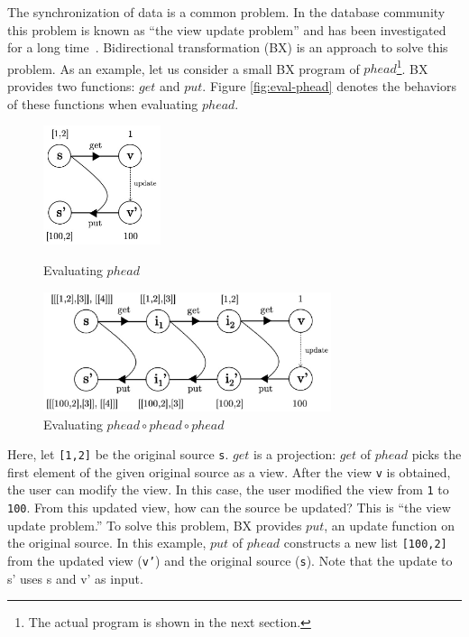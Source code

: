 The synchronization of data is a common problem. In the database community this problem is known as “the view update problem” and has been investigated for a long time~\cite{viewupdate}. Bidirectional transformation (BX) is an approach to solve this problem.
As an example, let us consider a small BX program of $phead$\footnote{The actual program is shown in the next section.}. BX provides two functions: $get$ and $put$. Figure \ref{fig:eval-phead} denotes the behaviors of these functions when evaluating $phead$.

\begin{figure}[!t]
  \begin{minipage}{0.3\textwidth}
    \centering
    \includegraphics[height=3.5cm]{./fig/fig1.eps}
    \caption{Evaluating $phead$}
    \label{fig:eval-phead}
  \end{minipage}\hfill
  \begin{minipage}{0.7\textwidth}
    \centering
    \includegraphics[height=3.5cm]{./fig/fig2.eps}
    \caption{Evaluating $phead \circ phead \circ phead$}
    \label{fig:eval-comp-phead}
  \end{minipage}
\end{figure}

Here, let \texttt{[1,2]} be the original source \texttt{s}.
$get$ is a projection: $get$ of $phead$ picks the first element of the given original source as a view.
After the view \texttt{v} is obtained, the user can modify the view.
In this case, the user
modified the view
from \texttt{1} to \texttt{100}.
From this updated view, how can the source be updated?
This is ``the view update problem.''
To solve this problem, BX provides $put$, an update function on the original source.
In this example, $put$ of $phead$ constructs a new list \texttt{[100,2]} from the updated view (\texttt{v'}) and the original source (\texttt{s}).
Note that the update to s' uses s and v' as input.

